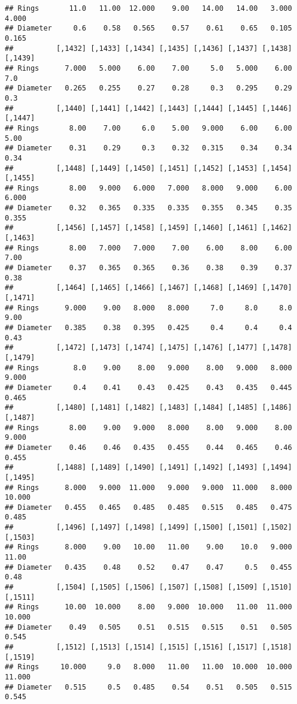 \documentclass[
]{article}
\begin{document}
\begin{verbatim}
## Rings       11.0   11.00  12.000    9.00   14.00   14.00   3.000   4.000
## Diameter     0.6    0.58   0.565    0.57    0.61    0.65   0.105   0.165
##          [,1432] [,1433] [,1434] [,1435] [,1436] [,1437] [,1438] [,1439]
## Rings      7.000   5.000    6.00    7.00     5.0   5.000    6.00     7.0
## Diameter   0.265   0.255    0.27    0.28     0.3   0.295    0.29     0.3
##          [,1440] [,1441] [,1442] [,1443] [,1444] [,1445] [,1446] [,1447]
## Rings       8.00    7.00     6.0    5.00   9.000    6.00    6.00    5.00
## Diameter    0.31    0.29     0.3    0.32   0.315    0.34    0.34    0.34
##          [,1448] [,1449] [,1450] [,1451] [,1452] [,1453] [,1454] [,1455]
## Rings       8.00   9.000   6.000   7.000   8.000   9.000    6.00   6.000
## Diameter    0.32   0.365   0.335   0.335   0.355   0.345    0.35   0.355
##          [,1456] [,1457] [,1458] [,1459] [,1460] [,1461] [,1462] [,1463]
## Rings       8.00   7.000   7.000    7.00    6.00    8.00    6.00    7.00
## Diameter    0.37   0.365   0.365    0.36    0.38    0.39    0.37    0.38
##          [,1464] [,1465] [,1466] [,1467] [,1468] [,1469] [,1470] [,1471]
## Rings      9.000    9.00   8.000   8.000     7.0     8.0     8.0    9.00
## Diameter   0.385    0.38   0.395   0.425     0.4     0.4     0.4    0.43
##          [,1472] [,1473] [,1474] [,1475] [,1476] [,1477] [,1478] [,1479]
## Rings        8.0    9.00    8.00   9.000    8.00   9.000   8.000   9.000
## Diameter     0.4    0.41    0.43   0.425    0.43   0.435   0.445   0.465
##          [,1480] [,1481] [,1482] [,1483] [,1484] [,1485] [,1486] [,1487]
## Rings       8.00    9.00   9.000   8.000    8.00   9.000    8.00   9.000
## Diameter    0.46    0.46   0.435   0.455    0.44   0.465    0.46   0.455
##          [,1488] [,1489] [,1490] [,1491] [,1492] [,1493] [,1494] [,1495]
## Rings      8.000   9.000  11.000   9.000   9.000  11.000   8.000  10.000
## Diameter   0.455   0.465   0.485   0.485   0.515   0.485   0.475   0.485
##          [,1496] [,1497] [,1498] [,1499] [,1500] [,1501] [,1502] [,1503]
## Rings      8.000    9.00   10.00   11.00    9.00    10.0   9.000   11.00
## Diameter   0.435    0.48    0.52    0.47    0.47     0.5   0.455    0.48
##          [,1504] [,1505] [,1506] [,1507] [,1508] [,1509] [,1510] [,1511]
## Rings      10.00  10.000    8.00   9.000  10.000   11.00  11.000  10.000
## Diameter    0.49   0.505    0.51   0.515   0.515    0.51   0.505   0.545
##          [,1512] [,1513] [,1514] [,1515] [,1516] [,1517] [,1518] [,1519]
## Rings     10.000     9.0   8.000   11.00   11.00  10.000  10.000  11.000
## Diameter   0.515     0.5   0.485    0.54    0.51   0.505   0.515   0.545

\end{verbatim}
\end{document}
